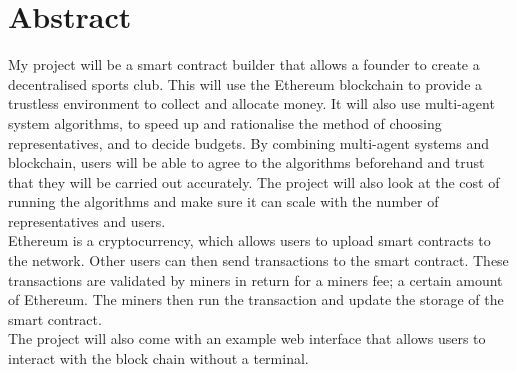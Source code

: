 \chapter{Abstract} \label{Chapter: Abstract}
My project will be a smart contract builder that allows a founder to create a decentralised sports club. This will use the Ethereum blockchain to provide a trustless environment to collect and allocate money.  It will also use multi-agent system algorithms, to speed up and rationalise the method of choosing representatives, and to decide budgets. By combining multi-agent systems and blockchain, users will be able to agree to the algorithms beforehand and trust that they will be carried out accurately. The project will also look at the cost of running the algorithms and make sure it can scale with the number of representatives and users. \\
Ethereum is a cryptocurrency, which allows users to upload smart contracts to the network. Other users can then send transactions to the smart contract. These transactions are validated by miners in return for a miners fee; a certain amount of Ethereum. The miners then run the transaction and update the storage of the smart contract.\\
The project will also come with an example web interface that allows users to interact with the block chain without a terminal.
